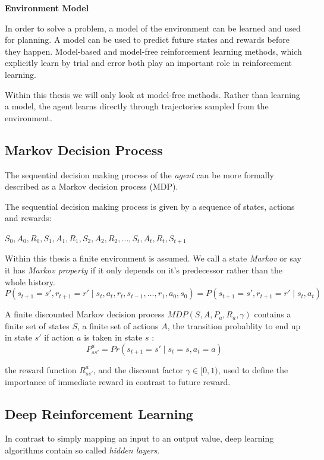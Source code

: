 \textbf{Environment Model}

In order to solve a problem, a model of the environment can be learned and used for planning. A model can be used to predict future states and rewards before they happen.
Model-based and model-free reinforcement learning methods, which explicitly learn by trial and error both play an important role in reinforcement learning.

Within this thesis we will only look at model-free methods. Rather than learning a model, the agent learns directly through trajectories sampled from the environment.

\pagebreak

\subsection{Markov Decision Process} 

The sequential decision making process of the \textit{agent} can be more formally described as a Markov decision process (MDP).

The sequential decision making process is given by a sequence of states, actions and rewards:

$S_0, A_0, R_0, S_1, A_1, R_1, S_2, A_2, R_2, \dots, S_t,A_t,R_t, S_{t+1}$

Within this thesis a finite environment is assumed. We call a state \textit{Markov} or say it has \textit{Markov property} if it only depends on it's predecessor rather than the whole history.
\begin{equation}
P(s_{t+1} = s', r_{t+1} = r' \mid s_t, a_t, r_t, s_{t-1}, \dots ,r_1,a_0,s_0) = P(s_{t+1} = s', r_{t+1} = r' \mid s_t,a_t)
\end{equation}

A finite discounted Markov decision process $MDP(S,A,P_a,R_a,\gamma)$ contains a finite set of states $S$, 
a finite set of actions $A$,
the transition probablity to end up in state $s'$ if action $a$ is taken in state $s$ : 
\begin{equation}
P^a_{s s'} = Pr(s_{t+1} = s' \mid s_t = s, a_t = a)
\end{equation}

the reward function $R^a_{s s'}$,
and the discount factor $\gamma  \in [0,1)$, used to define the importance of immediate reward in contrast to future reward. 

\subsection{Deep Reinforcement Learning}
In contrast to simply mapping an input to an output value, deep learning algorithms contain so called \textit{hidden layers}.


